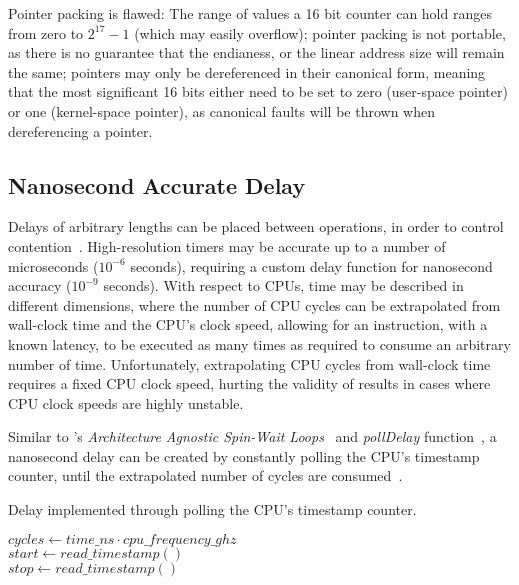 Pointer packing is flawed: The range of values a 16 bit counter can hold ranges
from zero to $2^{17}-1$ (which may easily overflow); pointer packing is not
portable, as there is no guarantee that the endianess, or the linear address
size will remain the same; pointers may only be dereferenced in their canonical
form, meaning that the most significant 16 bits either need to be set to zero
(user-space pointer) or one (kernel-space pointer), as canonical faults will be
thrown when dereferencing a pointer.

\subsection{Nanosecond Accurate Delay}
Delays of arbitrary lengths can be placed between operations, in order to
control contention~\citep{valois1994queues}. High-resolution timers may be accurate up
to a number of microseconds ($10^{-6}$ seconds), requiring a custom delay
function for nanosecond accuracy ($10^{-9}$ seconds). With respect to CPUs,
time may be described in different dimensions,
where the number of CPU cycles can be extrapolated from wall-clock time and the
CPU's clock speed, allowing for an instruction, with a known latency, to be
executed as many times as required to consume an arbitrary number of
time. Unfortunately, extrapolating CPU cycles from wall-clock time
requires a fixed CPU clock speed, hurting the validity of results in cases
where CPU clock speeds are highly unstable.


Similar to \citeauthor{intel2018spinloop}'s
\emph{Architecture Agnostic Spin-Wait Loops}~\citep{intel2018spinloop} and
\emph{pollDelay} function~\citep[Example~2.3]{intelmanualoptimization}, a
nanosecond delay can be created by constantly polling the CPU's timestamp
counter, until the extrapolated number of cycles are
consumed~\cite{ramalhete2019delay}.

\begin{algorithm}
    \caption{Delay implemented through polling the CPU's timestamp counter.}\label{alg:delay}
            $cycles \gets time\_ns \cdot cpu\_frequency\_ghz$ \\
            $start \gets read\_timestamp()$ \\
            {
                $stop \gets read\_timestamp()$
            }
\end{algorithm}

